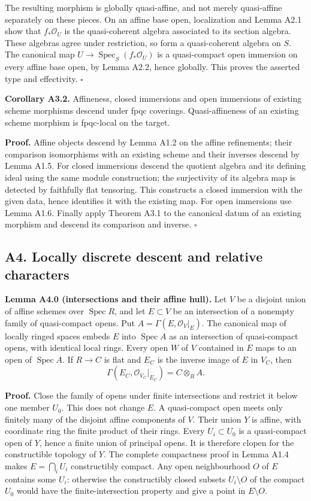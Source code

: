 \documentclass[11pt,a4paper,openany]{report}
\newcounter{none}
\begin{document}
The resulting morphism is globally quasi-affine, and not merely quasi-affine separately on these pieces. On an affine base open, localization and Lemma A2.1 show that \(f_*\mathcal O_U\) is the quasi-coherent algebra associated to its section algebra. These algebras agree under restriction, so form a quasi-coherent algebra on \(S\). The canonical map \(U\to\operatorname{Spec}_S(f_*\mathcal O_U)\) is a quasi-compact open immersion on every affine base open, by Lemma A2.2, hence globally. This proves the asserted type and effectivity. \(\square\)

\textbf{Corollary A3.2.} Affineness, closed immersions and open immersions of existing scheme morphisms descend under fpqc coverings. Quasi-affineness of an existing scheme morphism is fpqc-local on the target.

\textbf{Proof.} Affine objects descend by Lemma A1.2 on the affine refinements; their comparison isomorphisms with an existing scheme and their inverses descend by Lemma A1.5. For closed immersions descend the quotient algebra and its defining ideal using the same module construction; the surjectivity of its algebra map is detected by faithfully flat tensoring. This constructs a closed immersion with the given data, hence identifies it with the existing map. For open immersions use Lemma A1.6. Finally apply Theorem A3.1 to the canonical datum of an existing morphism and descend its comparison and inverse. \(\square\)

\subsection{A4. Locally discrete descent and relative characters}\label{AG-RG-S04-a4.-locally-discrete-descent-and-relative-characters}

\textbf{Lemma A4.0 (intersections and their affine hull).} Let \(V\) be a disjoint union of affine schemes over \(\operatorname{Spec}R\), and let \(E\subset V\) be an intersection of a nonempty family of quasi-compact opens. Put \(A=\Gamma(E,\mathcal O_V|_E)\). The canonical map of locally ringed spaces embeds \(E\) into \(\operatorname{Spec}A\) as an intersection of quasi-compact opens, with identical local rings. Every open \(W\) of \(V\) contained in \(E\) maps to an open of \(\operatorname{Spec}A\). If \(R\to C\) is flat and \(E_C\) is the inverse image of \(E\) in \(V_C\), then \[
\Gamma(E_C,\mathcal O_{V_C}|_{E_C})=C\otimes_R A.
\]

\textbf{Proof.} Close the family of opens under finite intersections and restrict it below one member \(U_0\). This does not change \(E\). A quasi-compact open meets only finitely many of the disjoint affine components of \(V\). Their union \(Y\) is affine, with coordinate ring the finite product of their rings. Every \(U_i\subset U_0\) is a quasi-compact open of \(Y\), hence a finite union of principal opens. It is therefore clopen for the constructible topology of \(Y\). The complete compactness proof in Lemma A1.4 makes \(E=\bigcap_i U_i\) constructibly compact. Any open neighbourhood \(O\) of \(E\) contains some \(U_i\): otherwise the constructibly closed subsets \(U_i\setminus O\) of the compact \(U_0\) would have the finite-intersection property and give a point in \(E\setminus O\).
\end{document}
